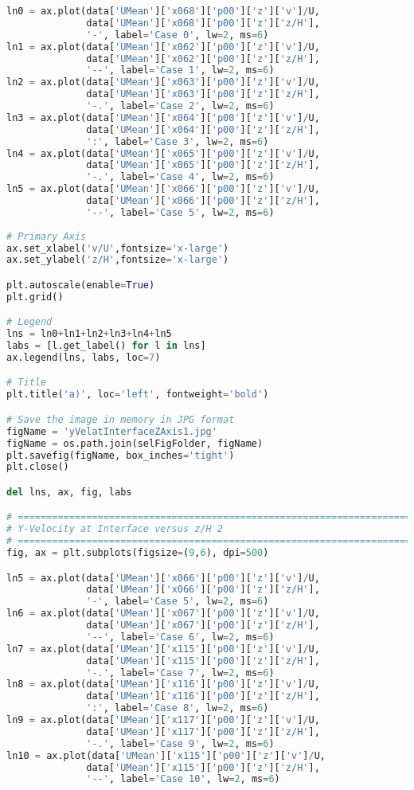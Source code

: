 \begin{lstlisting}[language=python]
ln0 = ax.plot(data['UMean']['x068']['p00']['z']['v']/U,
              data['UMean']['x068']['p00']['z']['z/H'],
              '-', label='Case 0', lw=2, ms=6)
ln1 = ax.plot(data['UMean']['x062']['p00']['z']['v']/U,
              data['UMean']['x062']['p00']['z']['z/H'],
              '--', label='Case 1', lw=2, ms=6)
ln2 = ax.plot(data['UMean']['x063']['p00']['z']['v']/U,
              data['UMean']['x063']['p00']['z']['z/H'],
              '-.', label='Case 2', lw=2, ms=6)
ln3 = ax.plot(data['UMean']['x064']['p00']['z']['v']/U,
              data['UMean']['x064']['p00']['z']['z/H'],
              ':', label='Case 3', lw=2, ms=6)
ln4 = ax.plot(data['UMean']['x065']['p00']['z']['v']/U,
              data['UMean']['x065']['p00']['z']['z/H'],
              '-.', label='Case 4', lw=2, ms=6)
ln5 = ax.plot(data['UMean']['x066']['p00']['z']['v']/U,
              data['UMean']['x066']['p00']['z']['z/H'],
              '--', label='Case 5', lw=2, ms=6)
    
# Primary Axis
ax.set_xlabel('v/U',fontsize='x-large')
ax.set_ylabel('z/H',fontsize='x-large')

plt.autoscale(enable=True)
plt.grid()

# Legend
lns = ln0+ln1+ln2+ln3+ln4+ln5
labs = [l.get_label() for l in lns]
ax.legend(lns, labs, loc=7)

# Title
plt.title('a)', loc='left', fontweight='bold')

# Save the image in memory in JPG format
figName = 'yVelatInterfaceZAxis1.jpg'
figName = os.path.join(selFigFolder, figName)
plt.savefig(figName, box_inches='tight')
plt.close()

del lns, ax, fig, labs

# =============================================================================
# Y-Velocity at Interface versus z/H 2
# =============================================================================
fig, ax = plt.subplots(figsize=(9,6), dpi=500)

ln5 = ax.plot(data['UMean']['x066']['p00']['z']['v']/U,
              data['UMean']['x066']['p00']['z']['z/H'],
              '-', label='Case 5', lw=2, ms=6)
ln6 = ax.plot(data['UMean']['x067']['p00']['z']['v']/U,
              data['UMean']['x067']['p00']['z']['z/H'],
              '--', label='Case 6', lw=2, ms=6)
ln7 = ax.plot(data['UMean']['x115']['p00']['z']['v']/U,
              data['UMean']['x115']['p00']['z']['z/H'],
              '-.', label='Case 7', lw=2, ms=6)
ln8 = ax.plot(data['UMean']['x116']['p00']['z']['v']/U,
              data['UMean']['x116']['p00']['z']['z/H'],
              ':', label='Case 8', lw=2, ms=6)
ln9 = ax.plot(data['UMean']['x117']['p00']['z']['v']/U,
              data['UMean']['x117']['p00']['z']['z/H'],
              '-.', label='Case 9', lw=2, ms=6)
ln10 = ax.plot(data['UMean']['x115']['p00']['z']['v']/U,
              data['UMean']['x115']['p00']['z']['z/H'],
              '--', label='Case 10', lw=2, ms=6)
    

\end{lstlisting}
